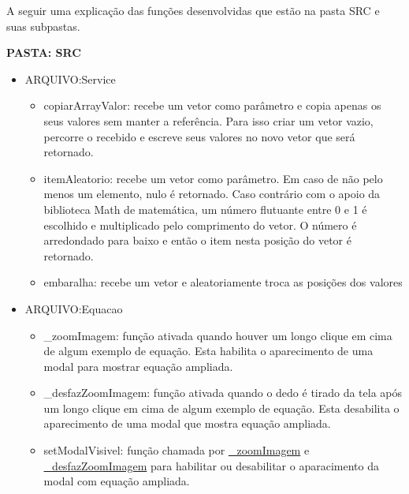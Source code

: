 A seguir uma explicação das funções desenvolvidas que estão na pasta SRC e suas subpastas.

\textbf{PASTA: SRC}
\begin{itemize}
\item ARQUIVO:Service
	\begin{itemize}
		\item copiarArrayValor: recebe um vetor como parâmetro e copia apenas os seus valores sem manter a referência. Para isso criar um vetor vazio, percorre o recebido e escreve seus valores no novo vetor que será retornado.

		\item itemAleatorio: recebe um vetor como parâmetro. Em caso de não pelo menos um elemento, nulo é retornado. Caso contrário com o apoio da biblioteca Math de matemática, um número flutuante entre 0 e 1 é escolhido e multiplicado pelo comprimento do vetor. O número é arredondado para baixo e então o item nesta posição do vetor é retornado.

		\item embaralha: recebe um vetor e aleatoriamente troca as posições dos valores

	\end{itemize}
\end{itemize}


\begin{itemize}
	\item ARQUIVO:Equacao

	\begin{itemize}

		\item \_zoomImagem: função ativada quando houver um longo clique em cima de algum exemplo de equação. Esta habilita o aparecimento de uma modal para mostrar equação ampliada.

		\item \_desfazZoomImagem: função ativada quando o dedo é tirado da tela após um longo clique em cima de algum exemplo de equação. Esta desabilita o aparecimento de uma modal que mostra equação ampliada.

		\item setModalVisivel: função chamada por \hyperref[_zoomImagem]{\_zoomImagem} e \hyperref[_desfazZoomImagem]{\_desfazZoomImagem} para habilitar ou desabilitar o aparacimento da modal com equação ampliada.
	
	\end{itemize}
	
\end{itemize}

